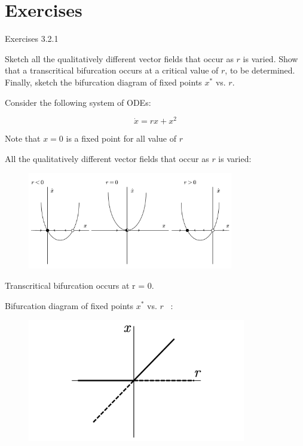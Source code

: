 \documentclass[10pt,aspectratio=43,mathserif,table]{beamer}
\begin{document}
\section{Exercises}

\begin{frame}{Exercises 3.2.1}

Sketch all the qualitatively different vector fields that occur as $r$ is varied. Show that a transcritical bifurcation occurs at a critical value of $r$, to be determined. Finally, sketch the bifurcation diagram of fixed points $x^*$ vs. $r$.

Consider the following system of ODEs:

$$\dot{x} = rx + x^2$$

Note that $x = 0$ is a fixed point for all value of $r$


\end{frame}


\begin{frame}
	All the qualitatively different vector fields that occur as $r$ is varied:
	\begin{figure}
		\centering
		\includegraphics[width=0.8\textwidth]{fig2.pdf}
	\end{figure}
	Transcritical bifurcation occurs at r = 0.
\end{frame}

\begin{frame}
	Bifurcation diagram of fixed points $x^*$ vs. $r$ \ :
	\begin{figure}
		\centering
		\includegraphics[width=0.85\textwidth]{fig3.pdf}
	\end{figure}
\end{frame}
\end{document}
